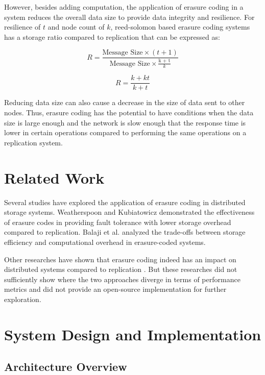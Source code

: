 However, besides adding computation, the application of erasure coding in a system reduces the overall data size to provide data integrity and resilience. For resilience of $t$ and node count of $k$, reed-solomon based erasure coding systems has a storage ratio compared to replication that can be expressed as:

\begin{equation}
	R = \frac{\text{Message Size} \times (t + 1)}{\text{Message Size} \times \frac{\text{k + t}}{k}}
	\label{eq:erasure_storage}
\end{equation}

\begin{equation}
	R = \frac{k + kt}{k + t}
\end{equation}

Reducing data size can also cause a decrease in the size of data sent to other nodes. Thus, erasure coding has the potential to have conditions when the data size is large enough and the network is slow enough that the response time is lower in certain operations compared to performing the same operations on a replication system.

\section{Related Work}

Several studies have explored the application of erasure coding in distributed storage systems. Weatherspoon and Kubiatowicz \cite{weatherspoon2002erasure} demonstrated the effectiveness of erasure codes in providing fault tolerance with lower storage overhead compared to replication. Balaji et al. \cite{balaji2018erasure} analyzed the trade-offs between storage efficiency and computational overhead in erasure-coded systems.

Other researches have shown that erasure coding indeed has an impact on distributed systems compared to replication \cite{mu2014paxos} \cite{wang2020craft}. But these researches did not sufficiently show where the two approaches diverge in terms of performance metrics and did not provide an open-source implementation for further exploration.

\section{System Design and Implementation}

\subsection{Architecture Overview}

